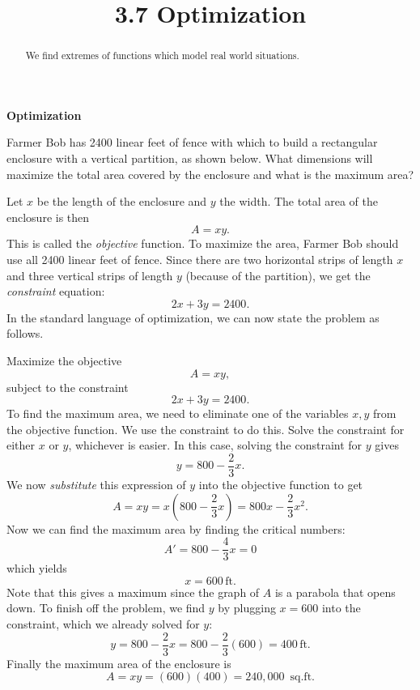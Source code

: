 \documentclass{ximera}
\title{3.7 Optimization}
\begin{document}
\begin{abstract}
We find extremes of functions which model real world situations.
\end{abstract}

\maketitle

\begin{center}
\textbf{Optimization}
\end{center}
 

\begin{example}[example 1]
Farmer Bob has 2400 linear feet of fence with which to build a rectangular enclosure with a vertical partition, as shown below.  
What dimensions will maximize the total area covered by the enclosure and what is the maximum area?
\begin{center}
\end{center}
Let $x$ be the length of the enclosure and $y$ the width.  The total area of the enclosure is then
\[A= xy.\]
This is called the {\it objective} function.
To maximize the area, Farmer Bob should use all 2400 linear feet of fence.  Since there are two horizontal strips of length $x$ and three vertical strips of length $y$ (because of the partition), we get the {\it constraint} equation:
\[2x+3y=2400.\]
In the standard language of optimization, we can now state the problem as follows.

Maximize the objective
\[A = xy,\]
subject to the constraint 
\[2x+3y = 2400.\]
To find the maximum area, we need to eliminate one of the variables $x, y$ from the objective function.
We use the constraint to do this.  Solve the constraint for either $x$ or $y$, whichever is easier.
In this case, solving the constraint for $y$ gives
\[y = 800 - \frac23 x.\]
We now {\it substitute} this expression of $y$ into the objective function to get 
\[A = xy = x(800 - \frac23 x) = 800x - \frac23 x^2.\]
Now we can find the maximum area by finding the critical numbers:
\[A' = 800 - \frac43 x = 0 \]
which yields
\[x= 600 \,\mbox{ft.}\]
Note that this gives a maximum since the graph of $A$ is a parabola that opens down.
To finish off the problem, we find $y$ by plugging $x = 600$ into the constraint, which we already solved for $y$:
\[y = 800 - \frac23 x = 800 - \frac23(600) = 400 \,\mbox{ft.}\]
Finally the maximum area of the enclosure is
\[A = xy = (600)(400) = 240{,}000 \,\mbox{ sq.ft.}\]
\end{example}
\end{document}
